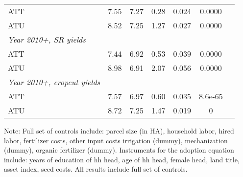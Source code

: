 \begin{table}[H]
\begin{threeparttable}
\begin{tabular}{l cccccc}
ATT         &        7.55&        7.27&        0.28&       0.024&      0.0000\\
%
%
%
ATU         &        8.52&        7.25&        1.27&       0.027&      0.0000\\
%
%
%
\textit{Year 2010+, SR yields}&            &            &            &            &            \\
ATT         &        7.44&        6.92&        0.53&       0.039&      0.0000\\
%
%
%
ATU         &        8.98&        6.91&        2.07&       0.056&      0.0000\\
%
%
%
\textit{Year 2010+, cropcut yields}&            &            &            &            &            \\
ATT         &        7.57&        6.97&        0.60&       0.035&     8.6e-65\\
%
%
%
ATU         &        8.72&        7.25&        1.47&       0.019&           0\\
\hline
\hline
\end{tabular}
\begin{tablenotes}
\footnotesize
\item{Note: Full set of controls include: parcel size (in HA), household labor, hired labor, fertilizer costs, other input costs irrigation (dummy), mechanization (dummy), organic fertilizer (dummy). Instruments for the adoption equation include: years of education of hh head, age of hh head, female head, land title, asset index, seed costs. All results include full set of controls. }
\end{tablenotes}
\end{threeparttable}
\end{table}
